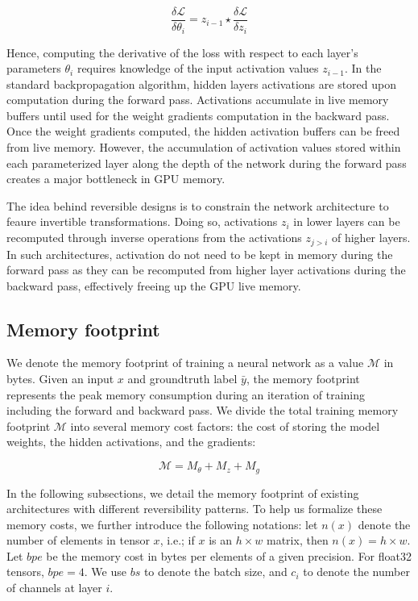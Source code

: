 \documentclass[twocolumn]{bmcart}
\begin{document}
 \begin{equation}
\frac{\delta \mathcal{L}}{\delta \theta_i} = z_{i-1} \star \frac{\delta \mathcal{L}}{\delta z_i} 
 \end{equation}

Hence, computing the derivative of the loss with respect to each layer's parameters $\theta_i$ requires knowledge of the input activation values $z_{i-1}$.  
In the standard backpropagation algorithm, hidden layers activations are stored upon computation during the forward pass. 
Activations accumulate in live memory buffers until used for the weight gradients computation in the backward pass. 
Once the weight gradients computed, the hidden activation buffers can be freed from live memory. 
However, the accumulation of activation values stored within each parameterized layer along the depth of the network during the forward pass creates a major bottleneck in GPU memory.

The idea behind reversible designs is to constrain the network architecture to feaure invertible transformations. 
Doing so, activations $z_i$ in lower layers can be recomputed through inverse operations from the activations $z_{j>i}$ of higher layers. 
In such architectures, activation do not need to be kept in memory during the forward pass as they can be recomputed from higher layer activations during the backward pass, effectively freeing up the GPU live memory.

\subsection{Memory footprint}

We denote the memory footprint of training a neural network as a value $\mathcal{M}$ in bytes. Given an input $x$ and groundtruth label $\bar{y}$, the memory footprint represents the peak memory consumption during an iteration of training including the forward and backward pass. 
We divide the total training memory footprint $\mathcal{M}$ into several memory cost factors: the cost of storing the model weights, the hidden activations, and the gradients:

\begin{equation}
\mathcal{M} = M_{\theta} + M_{z} + M_{g}
\end{equation}

In the following subsections, we detail the memory footprint of existing architectures with different reversibility patterns. 
To help us formalize these memory costs, we further introduce the following notations: let $n(x)$ denote the number of elements in tensor $x$, i.e.; if $x$ is an $h \times w$ matrix, then $n(x)=h \times w$. 
Let $bpe$ be the memory cost in bytes per elements of a given precision. 
For float32 tensors, $bpe=4$. We use $bs$ to denote the batch size, and $c_i$ to denote the number of channels at layer $i$.
\end{document}
